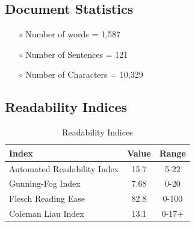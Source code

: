 \documentclass[12pt]{article}
\begin{document}
\subsection{Document Statistics}
\begin{itemize}
    \item[$\scriptstyle\circ$] Number of words = 1,587
    \item[$\scriptstyle\circ$] Number of Sentences = 121
    \item[$\scriptstyle\circ$] Number of Characters = 10,329
\end{itemize}

\subsection{Readability Indices}
\vspace{\baselineskip}

\begin{table}[h]
\centering
\begin{tabular}{|l|c|c|}
\hline
\textbf{Index}              & \textbf{Value} & \textbf{Range} \\ 
\hline
Automated Readability Index & 15.7            & 5-22       \\ 
\hline
Gunning-Fog Index           & 7.68           & 0-20           \\ 
\hline
Flesch Reading Ease         & 82.8           & 0-100          \\ 
\hline
Coleman Liau Index          & 13.1          & 0-17+          \\ 
\hline
\end{tabular}
\caption{Readability Indices}
\end{table}
\end{document}
